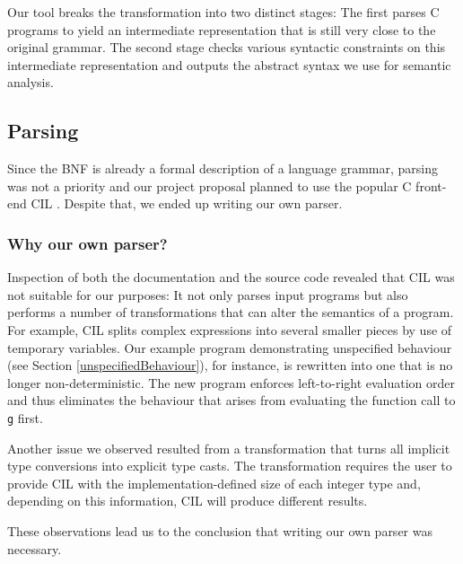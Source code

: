 \documentclass[a4paper,12pt]{scrbook}
\theoremstyle{plain}
\theoremstyle{definition}
\newcommand{\name}[1]{\textsf{#1}}
\begin{document}
Our tool breaks the transformation into two distinct stages: The first parses C
programs to yield an intermediate representation that is still very close to the
original grammar. The second stage checks various syntactic constraints
on this intermediate representation and outputs the abstract syntax we use for
semantic analysis.




\subsection{Parsing}\label{parsing}
Since the BNF is already a formal description of a language grammar, parsing was
not a priority and our project proposal planned to use the popular C front-end
\name{CIL} \cite{cil}. Despite that, we ended up writing our own parser.

\subsubsection{Why our own parser?}
Inspection of both the documentation and the source code revealed that
\name{CIL} was not suitable for our purposes: It not only parses input programs
but also performs a number of transformations that can alter the semantics of a
program. For example, \name{CIL} splits complex expressions into several smaller
pieces by use of temporary variables. Our example program demonstrating
unspecified behaviour (see Section \ref{unspecifiedBehaviour}), for instance, is
rewritten into one that is no longer non-deterministic. The new program
 enforces left-to-right evaluation order and
thus eliminates the behaviour that arises from evaluating the function call to
\lstinline{g} first.

Another issue we observed resulted from a transformation that turns all implicit
type conversions into explicit type casts. The transformation requires the user
to provide \name{CIL} with the implementation-defined size of each integer type
and, depending on this information, \name{CIL} will produce different results.

These observations lead us to the conclusion that writing our own parser was
necessary.
\end{document}

